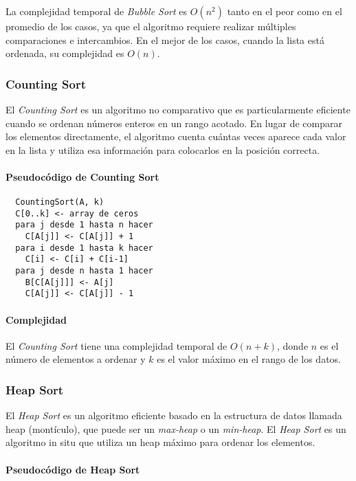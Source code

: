 La complejidad temporal de \textit{Bubble Sort} es \( O(n^2) \) tanto en el peor como en el promedio de los casos, ya que el algoritmo requiere realizar múltiples comparaciones e intercambios. En el mejor de los casos, cuando la lista está ordenada, su complejidad es \( O(n) \).

\subsubsection{Counting Sort}

El \textit{Counting Sort} es un algoritmo no comparativo que es particularmente eficiente cuando se ordenan números enteros en un rango acotado. En lugar de comparar los elementos directamente, el algoritmo cuenta cuántas veces aparece cada valor en la lista y utiliza esa información para colocarlos en la posición correcta.

\paragraph{Pseudocódigo de Counting Sort}

\begin{verbatim}
  CountingSort(A, k)
  C[0..k] <- array de ceros
  para j desde 1 hasta n hacer
    C[A[j]] <- C[A[j]] + 1
  para i desde 1 hasta k hacer
    C[i] <- C[i] + C[i-1]
  para j desde n hasta 1 hacer
    B[C[A[j]]] <- A[j]
    C[A[j]] <- C[A[j]] - 1
\end{verbatim}

\paragraph{Complejidad}

El \textit{Counting Sort} tiene una complejidad temporal de \( O(n + k) \), donde \( n \) es el número de elementos a ordenar y \( k \) es el valor máximo en el rango de los datos.

\subsubsection{Heap Sort}

El \textit{Heap Sort} es un algoritmo eficiente basado en la estructura de datos llamada heap (montículo), que puede ser un \textit{max-heap} o un \textit{min-heap}. El \textit{Heap Sort} es un algoritmo in situ que utiliza un heap máximo para ordenar los elementos.

\paragraph{Pseudocódigo de Heap Sort}

